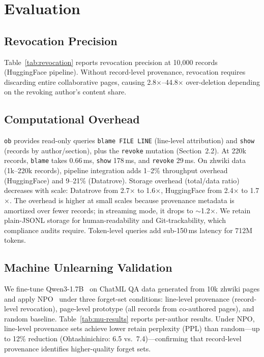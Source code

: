 \section{Evaluation}
\label{sec:evaluation}

\subsection{Revocation Precision}

Table~\ref{tab:revocation} reports revocation precision at 10,000 records (HuggingFace pipeline). Without record-level provenance, revocation requires discarding entire collaborative pages, causing 2.8$\times$--44.8$\times$ over-deletion depending on the revoking author's content share.



\subsection{Computational Overhead}

\texttt{ob} provides read-only queries \texttt{blame FILE LINE} (line-level attribution) and \texttt{show} (records by author/section), plus the \texttt{revoke} mutation (Section~2.2). At 220k records, \texttt{blame} takes 0.66\,ms, \texttt{show} 178\,ms, and \texttt{revoke} 29\,ms. On zhwiki data (1k--220k records), pipeline integration adds 1--2\% throughput overhead (HuggingFace) and 9--21\% (Datatrove). Storage overhead (total/data ratio) decreases with scale: Datatrove from 2.7$\times$ to 1.6$\times$, HuggingFace from 2.4$\times$ to 1.7$\times$. The overhead is higher at small scales because provenance metadata is amortized over fewer records; in streaming mode, it drops to $\sim$1.2$\times$. We retain plain-JSONL storage for human-readability and Git-trackability, which compliance audits require. Token-level queries add sub-150\,ms latency for 712M tokens.

\subsection{Machine Unlearning Validation}

We fine-tune Qwen3-1.7B~\cite{qwen3_2025} on ChatML QA data generated from 10k zhwiki pages and apply NPO~\cite{zhang2024npo} under three forget-set conditions: line-level provenance (record-level revocation), page-level prototype (all records from co-authored pages), and random baseline. Table~\ref{tab:mu-results} reports per-author results. Under NPO, line-level provenance sets achieve lower retain perplexity (PPL) than random---up to 12\% reduction (Ohtashinichiro: 6.5 vs.\ 7.4)---confirming that record-level provenance identifies higher-quality forget sets.

